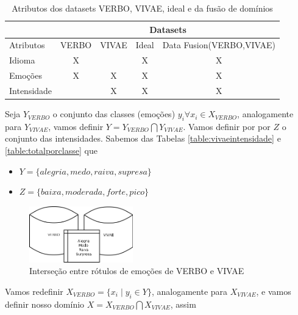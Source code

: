 \begin{table}[!h]
\centering
\label{table:datasetideal}
\caption{Atributos dos datasets VERBO, VIVAE, ideal e da fusão de domínios}
\begin{tabular}{l|cccc|}
\cline{2-5}
 & \multicolumn{4}{c|}{Datasets} \\ \hline
\multicolumn{1}{|l|}{Atributos} & \multicolumn{1}{c|}{VERBO} & \multicolumn{1}{c|}{VIVAE} & \multicolumn{1}{c|}{Ideal} & Data Fusion(VERBO,VIVAE) \\ \hline
\multicolumn{1}{|l|}{Idioma} & \multicolumn{1}{c|}{X} & \multicolumn{1}{c|}{} & \multicolumn{1}{c|}{X} & X \\ \hline
\multicolumn{1}{|l|}{Emoções} & \multicolumn{1}{c|}{X} & \multicolumn{1}{c|}{X} & \multicolumn{1}{c|}{X} & X \\ \hline
\multicolumn{1}{|l|}{Intensidade} & \multicolumn{1}{c|}{} & \multicolumn{1}{c|}{X} & \multicolumn{1}{c|}{X} & X \\ \hline
\end{tabular}
\end{table}

Seja $Y_{VERBO}$ o conjunto das classes (emoções) $y_i \forall x_i \in X_{VERBO}$, analogamente para $Y_{VIVAE}$, vamos definir $Y = Y_{VERBO} \bigcap Y_{VIVAE}$. Vamos definir por por $Z$ o conjunto das intensidades. Sabemos das Tabelas \ref{table:vivaeintensidade} e \ref{table:totalporclasse} que

\begin{itemize}
    \item $Y = \{alegria, medo, raiva, supresa\}$
    \item $Z = \{baixa, moderada, forte, pico\}$
\end{itemize}

\begin{figure}[!h]
\centering
\includegraphics[width=0.40\textwidth]{imagens/p-yverbointeryvivae.png}
\caption{\label{fig:yverbointeryvivae}Interseção entre rótulos de emoções de VERBO e VIVAE}
\end{figure}

Vamos redefinir $X_{VERBO} = \{x_i \mid y_i \in Y\}$, analogamente para $X_{VIVAE}$, e vamos definir nosso domínio $X = X_{VERBO} \bigcap X_{VIVAE}$, assim

